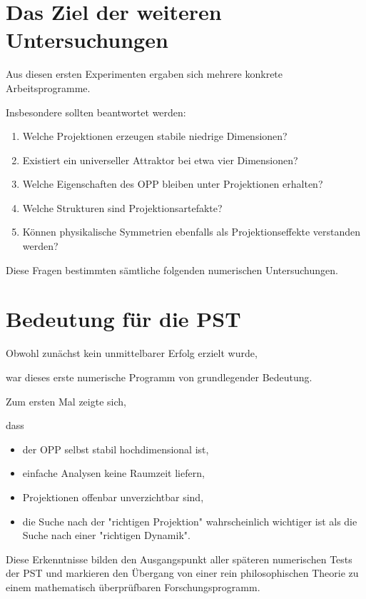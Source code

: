\section*{Das Ziel der weiteren Untersuchungen}

Aus diesen ersten Experimenten ergaben sich mehrere konkrete Arbeitsprogramme.

Insbesondere sollten beantwortet werden:

\begin{enumerate}

\item Welche Projektionen erzeugen stabile niedrige Dimensionen?

\item Existiert ein universeller Attraktor bei etwa vier Dimensionen?

\item Welche Eigenschaften des OPP bleiben unter Projektionen erhalten?

\item Welche Strukturen sind Projektionsartefakte?

\item Können physikalische Symmetrien ebenfalls als Projektionseffekte verstanden werden?

\end{enumerate}

Diese Fragen bestimmten sämtliche folgenden numerischen Untersuchungen.

\section*{Bedeutung für die PST}

Obwohl zunächst kein unmittelbarer Erfolg erzielt wurde,

war dieses erste numerische Programm von grundlegender Bedeutung.

Zum ersten Mal zeigte sich,

dass

\begin{itemize}

\item der OPP selbst stabil hochdimensional ist,

\item einfache Analysen keine Raumzeit liefern,

\item Projektionen offenbar unverzichtbar sind,

\item die Suche nach der "richtigen Projektion" wahrscheinlich wichtiger ist als die Suche nach einer "richtigen Dynamik".

\end{itemize}

Diese Erkenntnisse bilden den Ausgangspunkt aller späteren numerischen Tests der PST und markieren den Übergang von einer rein philosophischen Theorie zu einem mathematisch überprüfbaren Forschungsprogramm.


